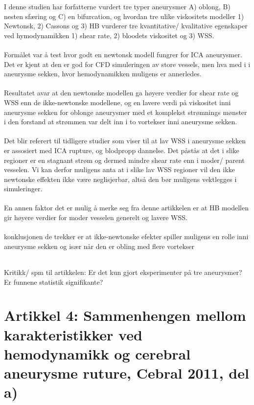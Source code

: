 \documentclass{article}
\begin{document}
I denne studien har forfatterne vurdert tre typer aneurysmer A) oblong, B) nesten sfæring og C) en bifurcation, og hvordan tre ulike viskositets modeller 1) Newtonsk, 2) Cassons og 3) HB vurderer tre kvantitative/ kvalitative egenskaper ved hymodynamikken 1) shear rate, 2) bloodets viskositet og 3) WSS. \\
\\Formålet var å test hvor godt en newtonsk modell fungrer for ICA aneurysmer.
Det er kjent at den er god for CFD simuleringen av store vessels, men hva med i i aneurysme sekken, hvor hemodynamikken muligens er annerledes. 
\\
\\Resultatet avar at den newtonske modellen ga høyere verdier for shear rate og WSS enn de ikke-newtonske modellene, og en lavere verdi på viskositet inni aneurysme sekken for oblonge aneurysmer med et komplekst strømnings mønster i den forstand at strømmen var delt inn i to vortekser inni aneurysme sekken. 
\\
\\Det blir referert til tidligere studier som viser til at lav WSS i aneurysme sekken er assosiert med ICA rupture, og blodpropp dannelse. Det påstås at det i slike regioner er en stagnant strøm og dermed mindre shear rate enn i moder/ parent vesselen. Vi kan derfor muligens anta at i slike lav WSS regioner vil den ikke newtonske effekten ikke være neglisjerbar, altså den bør muligens vektlegges i simuleringer. 
\\
\\En annen faktor det er mulig å merke seg fra denne artikkelen er at HB modellen gir høyere verdier for moder vesselen generelt og lavere WSS. 
\\
\\konklusjonen de trekker er at ikke-newtonske efekter spiller muligens en rolle inni aneurysme sekken og især når den er obling med flere vortekser


\\Kritikk/ spm til artikkelen: Er det kun gjort eksperimenter på tre aneurysmer? Er funnene statistik signifikante? 




\section{Artikkel 4: Sammenhengen mellom karakteristikker ved hemodynamikk og cerebral aneurysme ruture, Cebral 2011, del a)}
\end{document}
